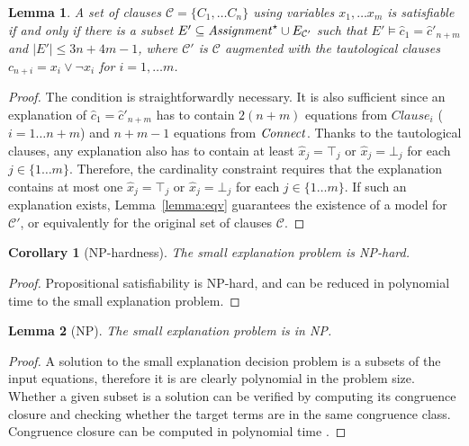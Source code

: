 \documentclass{easychair}
\newtheorem{corollary}{Corollary}
\newtheorem{lemma}{Lemma}
\begin{document}

\begin{lemma}
A set of clauses $\mathcal{C}= \{C_1, \dots C_n\}$ using variables $x_1,\dots
x_m$ is satisfiable if and only if there is a subset $E' \subseteq
{\it Assignment}^\star \cup E_{\mathcal{C}'}$ such that $E'\models \hat{c}_1 =
\hat{c}'_{n+m}$ and $|E'| \leq 3n+4m-1$, where $\mathcal{C}'$ is $\mathcal{C}$
augmented with the tautological clauses $c_{n+i} = x_i \vee \neg x_i$ for
$i=1,\dots m$.
\end{lemma}
\begin{proof}
The condition is straightforwardly necessary.  It is also sufficient since an
explanation of $\hat{c}_1 = \hat{c}'_{n+m}$ has to contain $2(n + m)$
equations from $Clause_i$ ($i= 1\dots n + m$) and $n + m - 1$ equations from
${\it Connect}$.  Thanks to the tautological clauses, any explanation also has to
contain at least $\hat{x}_j = \top_j$ or $\hat{x}_j = \bot_j$ for each
$j\in\{1\dots m\}$. Therefore, the cardinality constraint requires that the explanation
contains at most one $\hat{x}_j = \top_j$ or $\hat{x}_j = \bot_j$ for each
$j\in\{1\dots m\}$.  If such an explanation exists, Lemma~\ref{lemma:eqv}
guarantees the existence of a model for $\mathcal{C'}$, or equivalently for
the original set of clauses $\mathcal{C}$.
\end{proof}




\begin{corollary}[NP-hardness]
\label{lemma:nphardness}
The small explanation problem is NP-hard.
\end{corollary}
\begin{proof}
Propositional satisfiability is NP-hard, and can be reduced in polynomial time
to the small explanation problem.
\end{proof}

\begin{lemma}[NP]
\label{lemma:innp}
The small explanation problem is in NP.
\end{lemma}
\begin{proof}
A solution to the small explanation decision problem is a subsets of the input
equations, therefore it is are clearly polynomial in the problem size.  Whether
a given subset is a solution can be verified by computing its congruence closure
and checking whether the target terms are in the same congruence class.
Congruence closure can be computed in polynomial time
\cite{Nelson2,Downey1,Nieuwenhuis6}.
\end{proof}
\end{document}
